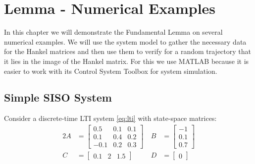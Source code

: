 \documentclass[12pt,a4paper]{report}
\begin{document}
\section{Lemma - Numerical Examples}

In this chapter we will demonstrate the Fundamental Lemma on several numerical examples. We will use the system model to gather the necessary data
for the Hankel matrices and then use them to verify for a random trajectory that it lies in the image of the Hankel matrix. For this we use MATLAB \cite{matlab2025b} because it is
easier to work with its Control System Toolbox for system simulation.

\subsection{Simple SISO System}

Consider a discrete-time LTI system \eqref{eq:lti} with state-space matrices:
\begin{alignat}{2}
    A &= \begin{bmatrix} 0.5 & 0.1 & 0.1 \\ 0.1 & 0.4 & 0.2 \\ -0.1 & 0.2 & 0.3\end{bmatrix} \ & B &= \begin{bmatrix} -1 \\ 0.1 \\ 0.7\end{bmatrix} \\
    C &= \begin{bmatrix} 0.1 & 2 & 1.5\end{bmatrix}  \ & D &= \begin{bmatrix} 0 \end{bmatrix}
\end{alignat}
\end{document}
